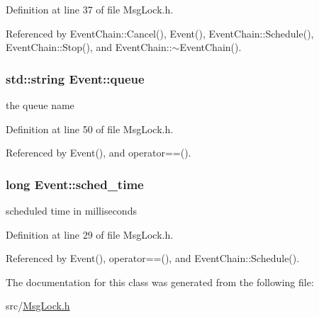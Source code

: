 \-Definition at line 37 of file \-Msg\-Lock.\-h.



\-Referenced by \-Event\-Chain\-::\-Cancel(), \-Event(), \-Event\-Chain\-::\-Schedule(), \-Event\-Chain\-::\-Stop(), and \-Event\-Chain\-::$\sim$\-Event\-Chain().

\hypertarget{classEvent_acaeeb3bd2c79b564a896c18f0188c264}{
\subsubsection[{queue}]{\setlength{\rightskip}{0pt plus 5cm}std\-::string {\bf \-Event\-::queue}}}\label{d5/da5/classEvent_acaeeb3bd2c79b564a896c18f0188c264}


the queue name 



\-Definition at line 50 of file \-Msg\-Lock.\-h.



\-Referenced by \-Event(), and operator==().

\hypertarget{classEvent_af44247209b624738228d66efe4a5eb36}{
\subsubsection[{sched\-\_\-time}]{\setlength{\rightskip}{0pt plus 5cm}long {\bf \-Event\-::sched\-\_\-time}}}\label{d5/da5/classEvent_af44247209b624738228d66efe4a5eb36}


scheduled time in milliseconds 



\-Definition at line 29 of file \-Msg\-Lock.\-h.



\-Referenced by \-Event(), operator==(), and \-Event\-Chain\-::\-Schedule().



\-The documentation for this class was generated from the following file\-:\begin{DoxyCompactItemize}
\item 
src/\hyperlink{MsgLock_8h}{\-Msg\-Lock.\-h}\end{DoxyCompactItemize}
